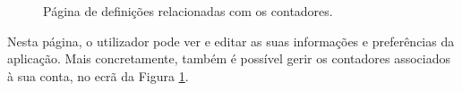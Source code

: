 \begin{figure}[ht!]
\begin{minipage}{.5\textwidth}
\caption{Página de definições relacionadas com os contadores.}
\label{fig:5}
\end{minipage}
\end{figure}

Nesta página, o utilizador pode ver e editar as suas informações e preferências da aplicação. Mais concretamente, também é possível gerir os contadores associados à sua conta, no ecrã da Figura \ref{fig:5}.

